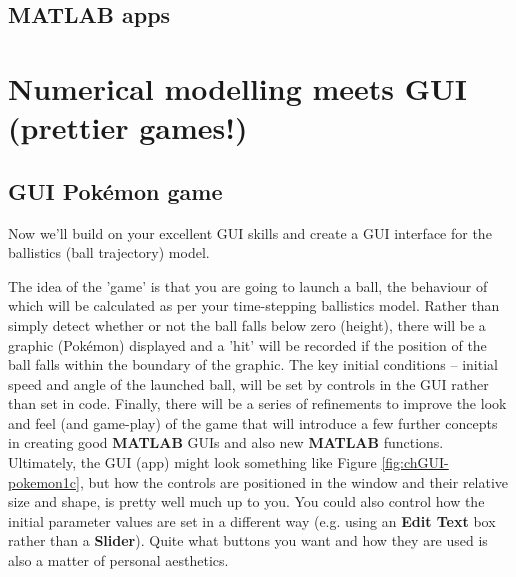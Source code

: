 \documentclass{tufte-book} %
\begin{document}

\newpage


\section{\textbf{MATLAB} apps}


%

\chapter{Numerical modelling meets GUI (prettier games!)}
\label{ch:10}


\newpage


\section{GUI Pok\'emon game}

Now we'll build on your excellent GUI skills and create a GUI interface for the ballistics (ball trajectory) model.

The idea of the 'game' is that you are going to launch a ball, the behaviour of which will be calculated as per your time-stepping ballistics model. Rather than simply detect whether or not the ball falls below zero (height), there will be a graphic (Pok\'emon) displayed and a 'hit' will be recorded if the position of the ball falls within the boundary of the graphic. The key initial conditions -- initial speed and angle of the launched ball, will be set by controls in the GUI rather than set in code. Finally, there will be a series of refinements to improve the look and feel (and game-play) of the game that will introduce a few further concepts in creating good \textbf{MATLAB} GUIs and also new \textbf{MATLAB} functions. 
Ultimately, the GUI (app) might look something like Figure \ref{fig:chGUI-pokemon1c}, but how the controls are positioned in the window and their relative size and shape, is pretty well much up to you. You could also control how the initial parameter values are set in a different way (e.g. using an \textbf{Edit Text} box rather than a \textbf{Slider}). Quite what buttons you want and how they are used is also a matter of personal aesthetics. 
\end{document}
